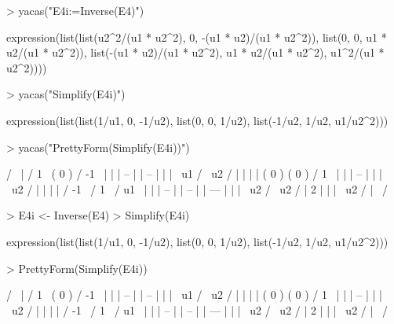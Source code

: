 \documentclass[]{article}
\begin{document}
\begin{Schunk}
\begin{Sinput}
> yacas("E4i:=Inverse(E4)")
\end{Sinput}
\begin{Soutput}
expression(list(list(u2^2/(u1 * u2^2), 0, -(u1 * u2)/(u1 * u2^2)), 
    list(0, 0, u1 * u2/(u1 * u2^2)), list(-(u1 * u2)/(u1 * u2^2), 
        u1 * u2/(u1 * u2^2), u1^2/(u1 * u2^2))))
\end{Soutput}
\begin{Sinput}
> yacas("Simplify(E4i)")
\end{Sinput}
\begin{Soutput}
expression(list(list(1/u1, 0, -1/u2), list(0, 0, 1/u2), list(-1/u2, 
    1/u2, u1/u2^2)))
\end{Soutput}
\begin{Sinput}
> yacas("PrettyForm(Simplify(E4i))")
\end{Sinput}
\begin{Soutput}
/                        \
| / 1  \ ( 0 )  / -1 \   |
| | -- |        | -- |   |
| \ u1 /        \ u2 /   |
|                        |
| ( 0 )  ( 0 )  / 1  \   |
|               | -- |   |
|               \ u2 /   |
|                        |
| / -1 \ / 1  \ / u1  \  |
| | -- | | -- | | --- |  |
| \ u2 / \ u2 / |   2 |  |
|               \ u2  /  |
\                        /
\end{Soutput}
\end{Schunk}


\begin{Schunk}
\begin{Sinput}
> E4i <- Inverse(E4)
> Simplify(E4i)
\end{Sinput}
\begin{Soutput}
expression(list(list(1/u1, 0, -1/u2), list(0, 0, 1/u2), list(-1/u2, 
    1/u2, u1/u2^2)))
\end{Soutput}
\begin{Sinput}
> PrettyForm(Simplify(E4i))
\end{Sinput}
\begin{Soutput}
/                        \
| / 1  \ ( 0 )  / -1 \   |
| | -- |        | -- |   |
| \ u1 /        \ u2 /   |
|                        |
| ( 0 )  ( 0 )  / 1  \   |
|               | -- |   |
|               \ u2 /   |
|                        |
| / -1 \ / 1  \ / u1  \  |
| | -- | | -- | | --- |  |
| \ u2 / \ u2 / |   2 |  |
|               \ u2  /  |
\                        /
\end{Soutput}
\end{Schunk}
\end{document}
